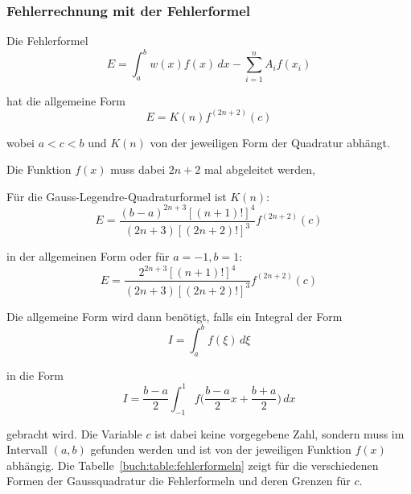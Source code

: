 \subsubsection{Fehlerrechnung mit der Fehlerformel}
Die Fehlerformel
\begin{equation}
    E = \int_{a}^{b} w(x) f(x) \, dx - \sum_{i=1}^{n}A_{i}f(x_{i})    
\end{equation} 

hat die allgemeine Form
\begin{equation}
    E = K(n)f^{(2n+2)}(c)
\end{equation}

wobei $a<c<b$ und $K(n)$ von der jeweiligen Form der Quadratur abhängt.

Die Funktion $f(x)$ muss dabei $2n+2$ mal abgeleitet werden,

Für die Gauss-Legendre-Quadraturformel ist $K(n)$:
\begin{equation}
    \label{quadratur:equation:errorformula}
    E = \frac{(b-a)^{2n+3}[(n+1)!]^{4}}{(2n+3)[(2n+2)!]^{3}}f^{(2n+2)}(c)
\end{equation}

in der allgemeinen Form oder für $a=-1, b=1$:
\begin{equation}
    E = \frac{2^{2n+3}[(n+1)!]^{4}}{(2n+3)[(2n+2)!]^{3}}f^{(2n+2)}(c)
\end{equation}

Die allgemeine Form wird dann benötigt, falls ein Integral der Form 
\begin{equation}
    I = \int_{a}^{b} f(\xi) \,d\xi
\end{equation}

in die Form
\begin{equation}
    I = \frac{b-a}{2} \int_{-1}^{1} f\bigg(\frac{b-a}{2}x + \frac{b+a}{2}\bigg) \,dx
\end{equation}

gebracht wird.
Die Variable $c$ ist dabei keine vorgegebene Zahl, 
sondern muss im Intervall $(a, b)$ gefunden werden und ist von der jeweiligen Funktion $f(x)$ abhängig.
Die Tabelle~\ref{buch:table:fehlerformeln} zeigt für die verschiedenen Formen
der Gaussquadratur die Fehlerformeln und deren Grenzen für $c$.


